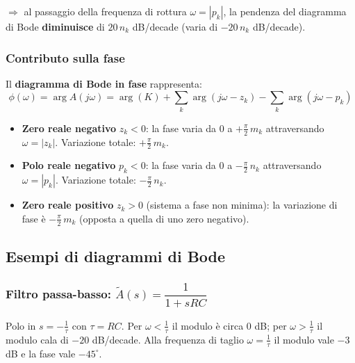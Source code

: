 $\Rightarrow$ al passaggio della frequenza di rottura $\omega = |p_k|$, la pendenza del diagramma di Bode \textbf{diminuisce} di $20\,n_k$ dB/decade (varia di $-20\,n_k$ dB/decade).

\subsubsection*{Contributo sulla fase}

Il \textbf{diagramma di Bode in fase} rappresenta:
\[
    \phi(\omega) = \arg A(j\omega) = \arg(K) + \sum_k \arg(j\omega - z_k) - \sum_k \arg(j\omega - p_k)
\]

\begin{itemize}
    \item \textbf{Zero reale negativo} $z_k < 0$: la fase varia da $0$ a $+\frac{\pi}{2}\,m_k$ attraversando $\omega = |z_k|$. Variazione totale: $+\frac{\pi}{2}\,m_k$.
    \item \textbf{Polo reale negativo} $p_k < 0$: la fase varia da $0$ a $-\frac{\pi}{2}\,n_k$ attraversando $\omega = |p_k|$. Variazione totale: $-\frac{\pi}{2}\,n_k$.
    \item \textbf{Zero reale positivo} $z_k > 0$ (sistema a fase non minima): la variazione di fase è $-\frac{\pi}{2}\,m_k$ (opposta a quella di uno zero negativo).
\end{itemize}

\subsection{Esempi di diagrammi di Bode}

\subsubsection*{Filtro passa-basso: $\tilde{A}(s) = \dfrac{1}{1+sRC}$}

Polo in $s = -\frac{1}{\tau}$ con $\tau = RC$. Per $\omega < \frac{1}{\tau}$ il modulo è circa $0$ dB; per $\omega > \frac{1}{\tau}$ il modulo cala di $-20$ dB/decade. Alla frequenza di taglio $\omega = \frac{1}{\tau}$ il modulo vale $-3$ dB e la fase vale $-45^\circ$.

